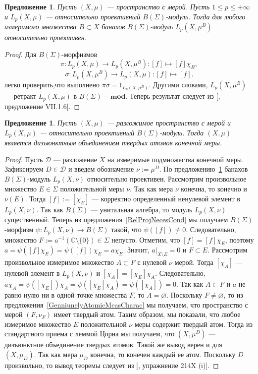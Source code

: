\documentclass[12pt]{article}
\newtheorem{proposition}[theorem]{Предложение}
\begin{document}
\begin{proposition}\label{BSigmaModLpRetrProj} Пусть $(X,\mu)$ --- пространство
    с мерой. Пусть $1\leq p\leq +\infty$ и $L_p(X,\mu)$ --- относительно
    проективный $B(\Sigma)$-модуль. Тогда для любого измеримого множества
    $B\subset X$ банахов $B(\Sigma)$-модуль $L_p(X,\mu^B)$ относительно
    проективен.
\end{proposition}
\begin{proof}
    Для $B(\Sigma)$-морфизмов
    $$
        \pi:L_p(X,\mu)\to L_p(X,\mu^B):[f]\mapsto [f]\chi_B,
    $$
    $$
        \sigma:L_p(X,\mu^B)\to L_p(X,\mu):[f]\mapsto [f].
    $$
    легко проверить,что выполнено $\pi\sigma=1_{L_p(X,\mu^B)}$. Другими словами,
    $L_p(X,\mu^B)$ --- ретракт $L_p(X,\mu)$ в $B(\Sigma)-\mathbf{mod}$. Теперь
    результат следует из [\cite{HelBanLocConvAlg}, предложение VII.1.6].
\end{proof}

\begin{proposition}\label{LpBSigmaModNecessCond} Пусть $(X,\mu)$ --- разложимое
    пространство с мерой и $L_p(X,\mu)$ --- относительно проективный
    $B(\Sigma)$-модуль. Тогда $(X,\mu)$ является дизъюнктным объединением
    твердых атомов конечной меры.
\end{proposition}
\begin{proof} Пусть $\mathcal{D}$ --- разложение $X$ на измеримые подмножества
    конечной меры. Зафиксируем $D\in\mathcal{D}$ и введем обозначение
    $\nu:=\mu^D$. По предложению~\ref{BSigmaModLpRetrProj} банахов
    $B(\Sigma)$-модуль $L_p(X,\nu)$ относительно проективен. Рассмотрим
    произвольное множество $E\in\Sigma$ положительной меры $\nu$. Так как мера
    $\nu$ конечна, то конечно и $\nu(E)$. Тогда $[f]:=[\chi_E]$ --- корректно
    определенный ненулевой элемент в $L_p(X,\nu)$. Так как $B(\Sigma)$ ---
    унитальная алгебра, то модуль $L_p(X,\nu)$ существенный. Теперь из
    предложения~\ref{RelProjNecesCond} мы получаем $B(\Sigma)$-морфизм
    $\psi:L_p(X,\nu)\to B(\Sigma)$ такой, что $\psi([f])\neq 0$. Следовательно,
    множество $F:=a^{-1}(\mathbb{C}\setminus \{0\})\in\Sigma$ непусто. Отметим,
    что $[f]=[f]\chi_E$, поэтому $a=\psi([f]\chi_E)=\psi([f])\chi_E=a\chi_E$.
    Значит, $a|_{X\setminus E}=0$ и $F\subset E$. Рассмотрим произвольное
    измеримое множество $A\subset F$ с нулевой $\nu$ мерой. Тогда $[\chi_A]$ ---
    нулевой элемент в  $L_p(X,\nu)$ и $[\chi_A]=[\chi_E]\chi_A$. Следовательно,
    $a\chi_A=\psi([\chi_E])\chi_A=\psi([\chi_E]\chi_A)=\psi([\chi_A])=0$. Так
    как $A\subset F$ и $a$ не равно нулю ни в одной точке множества $F$, то
    $A=\varnothing$. Поскольку $F\neq \varnothing$, то из
    предложения~\ref{GenniunelyAtomicMeasCharac} мы получаем, что пространство с
    мерой $(F,\nu_F)$ имеет твердый атом. Таким образом, мы показали, что любое
    измеримое множество $E$ положительной $\nu$ меры содержит твердый атом.
    Тогда из стандартного приема с леммой Цорна мы получаем, что $(X,\mu^D)$ ---
    дизъюнктное объединение твердых атомов. Такой же вывод верен и для
    $(X,\mu_D)$. Так как мера $\mu_D$ конечна, то конечен каждый ее атом.
    Поскольку $D$ произвольно, то вывод теоремы следует из [\cite{FremMeasTh2},
    упражнение 214X (i)].
\end{proof}
\end{document}
